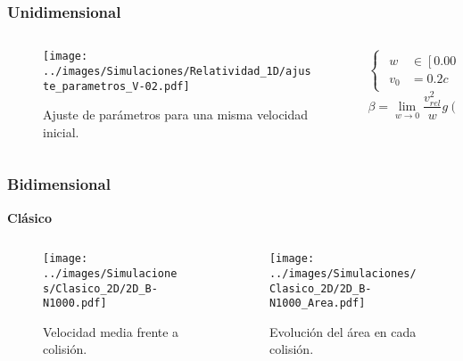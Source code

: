 \documentclass{beamer}
\begin{document}
\begin{frame}%
    \frametitle[prueb1]{Unidimensional}
    \begin{columns}
        \hspace{0.5cm}
        \begin{column}{0.5\textwidth}
            \begin{figure}
                \centering
                \texttt{[image: ../images/Simulaciones/Relatividad\_1D/ajuste\_parametros\_V-02.pdf]}
                \caption{Ajuste de parámetros para una misma velocidad inicial.}  
            \end{figure}         
        \end{column}
    \begin{column}{0.5\textwidth}
        \begin{equation*}
            \begin{cases}
                 \begin{aligned}
                    w &\in [0.001; 0.9]c \\ 
                    v_0 &= 0.2c
                \end{aligned}
            \end{cases}
        \end{equation*}
         \vspace{1cm}
         \begin{equation*}
            \beta = \lim_{w\rightarrow 0} \dfrac{v^2_{rel}}{w}g(w) = 0
        \end{equation*}
    \end{column}
    \end{columns}
\end{frame}

\begin{frame}
    \frametitle[prueb1]{Bidimensional}{}
    \centering
    \textbf{Clásico}
    \vspace{-0.5cm}
    \begin{columns}
        \hspace{-0.cm}
        \begin{column}{0.5\textwidth}
            \begin{figure}
                \centering
                \texttt{[image: ../images/Simulaciones/Clasico\_2D/2D\_B-N1000.pdf]}
                \caption{Velocidad media frente a colisión.}
            \end{figure}         
        \end{column}
        \begin{column}{0.5\textwidth}
            \begin{figure}
                \centering 
                \vspace{0.1cm}
                \texttt{[image: ../images/Simulaciones/Clasico\_2D/2D\_B-N1000\_Area.pdf]}
                \caption{Evolución del área en cada colisión.}
            \end{figure}
        \end{column}
    \end{columns}
\end{frame}
\end{document}
